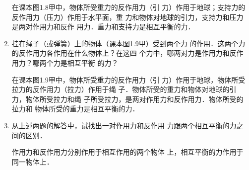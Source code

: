 \begin{enumerate}
\begin{solution}
    在课本图1.8甲中，物体所受重力的反作用力（引
    力）作用于地球；支持力的反作用力（压力）作用于水平面，重
    力和物体对地球的引力，支持力和压力是两对作用力和反作
    用力．重力和支持力是相互平衡的力．
\end{solution}
\item  挂在绳子（或弹簧）上的物体（课本图1.9甲）受到两个力
的作用．这两个力的反作用力各作用在什么物体上？在这四
个力中，哪两对力是作用力和反作用力？哪两个力是相互平衡
的力？

\begin{solution}
    在课本图1.9甲中，物体所受重力的反作用力（引
    力）作用于地球，物体所受拉力的反作用力（拉力）作用于绳
    子．物体所受的重力和物体对地球的引力，物体所受拉力和绳
    子所受拉力，是两对作用力和反作用力．物体所受的拉力和
    物体所受的重力是相互平衡的力．
\end{solution}
\item 从上述两题的解答中，试找出一对作用力和反作用
力跟两个相互平衡的力之间的区别．

\begin{solution}
    作用力和反作用力分别作用于相互作用的两个物体
    上，相互平衡的力作用于同一物体上．
\end{solution}
\end{enumerate}



